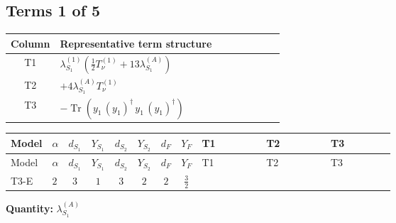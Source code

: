 \documentclass[8pt]{article}
\begin{document}
\begin{landscape}
\subsection*{Terms 1 of 5}
\begin{center}
\begin{tabular}{@{}c >{\raggedright\arraybackslash}p{0.82\linewidth}@{}}
\toprule
Column & Representative term structure \\
\midrule
T1 & \(\displaystyle {\lambda_{S_1}^{(1)}} \left(\frac{1}{2} T_{\nu}^{(1)}+13 {\lambda_{S_1}^{(A)}}\right)\) \\
\midrule
T2 & \(\displaystyle +4 {\lambda_{S_1}^{(A)}} T_{\nu}^{(1)}\) \\
\midrule
T3 & \(\displaystyle -\operatorname{Tr}\!\left({y_1}\,\left({y_1}\right)^{\dagger}\,{y_1}\,\left({y_1}\right)^{\dagger}\right)\) \\
\midrule
\bottomrule
\end{tabular}
\end{center}
\smallskip
\tiny
\begin{longtable}{@{}llcccccc >{\raggedright\arraybackslash}p{0.21\linewidth} >{\raggedright\arraybackslash}p{0.21\linewidth} >{\raggedright\arraybackslash}p{0.21\linewidth}@{}}
\toprule
Model & $\alpha$ & $d_{S_1}$ & $Y_{S_1}$ & $d_{S_2}$ & $Y_{S_2}$ & $d_F$ & $Y_F$ & T1 & T2 & T3 \\
\midrule
\endfirsthead
\toprule
Model & $\alpha$ & $d_{S_1}$ & $Y_{S_1}$ & $d_{S_2}$ & $Y_{S_2}$ & $d_F$ & $Y_F$ & T1 & T2 & T3 \\
\midrule
\endhead
T3-E & $2$ & $3$ & $1$ & $3$ & $2$ & $2$ & $\frac{3}{2}$ & \scriptsize\adjustbox{max width=\linewidth}{$\begin{gathered} {\lambda_{S_1}^{(1)}} \left(\frac{1}{2} T_{\nu}^{(1)}+13 {\lambda_{S_1}^{(A)}}\right)\end{gathered}$} & \scriptsize\adjustbox{max width=\linewidth}{$\begin{gathered} +4 {\lambda_{S_1}^{(A)}} T_{\nu}^{(1)}\end{gathered}$} & \scriptsize\adjustbox{max width=\linewidth}{$\begin{gathered} -\operatorname{Tr}\!\left({y_1}\,\left({y_1}\right)^{\dagger}\,{y_1}\,\left({y_1}\right)^{\dagger}\right)\end{gathered}$} \\
\midrule
\bottomrule
\end{longtable}
\clearpage
\noindent\textbf{Quantity: }$\lambda_{S_1}^{(A)}$\par\smallskip

\end{landscape}
\end{document}
